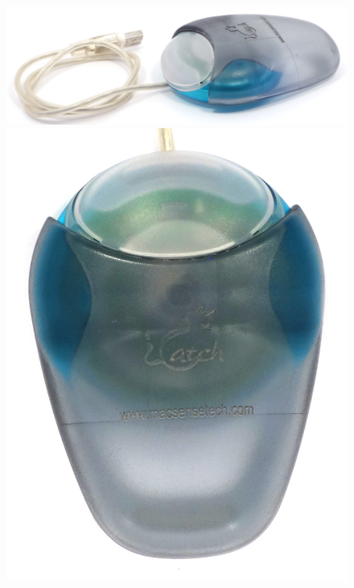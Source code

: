 \documentclass[11pt, a4paper]{article}
\begin{document}
\begin{figure}[h]
    \centering
    \includegraphics[scale=0.45]{1998_apple_puck/apple63.jpg}
    \includegraphics[scale=0.45]{1998_apple_puck/appleup63.JPG}

\end{figure}
\end{document}
